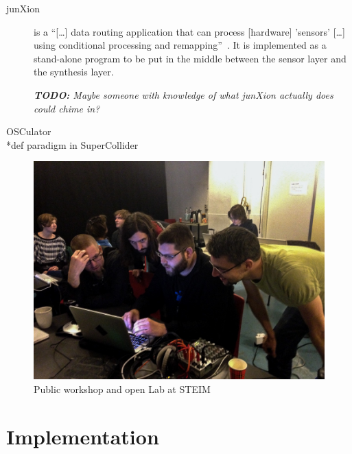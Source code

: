 \documentclass{article}
\newcommand{\todo}[1] {\emph{\textbf{TODO:} #1}}
\begin{document}
\begin{description}
	\item[junXion] is a \enquote{[\dots] data routing application that can process [hardware] 'sensors' [\dots] using conditional processing and remapping}~\cite{-jun}. 
	It is implemented as a stand-alone program to be put in the middle between the sensor layer and the synthesis layer.
	
	\todo{Maybe someone with knowledge of what junXion actually does could chime in?}
	\item[OSCulator] 
	\item[*def paradigm in SuperCollider]
\end{description}



\begin{figure}[h]
	\centering
		\includegraphics[width=.9\columnwidth]{../media/20140403-IMG_1667.jpg}
	\caption{Public workshop and open Lab at STEIM}
	\label{fig:media_20140403-IMG_1667}
\end{figure}



\section{Implementation}
\label{sec:implementation}
\end{document}
